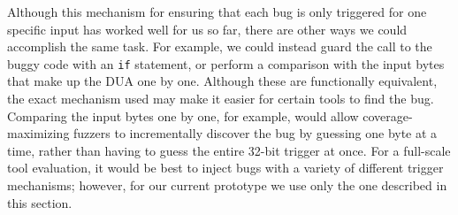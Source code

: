 Although this mechanism for ensuring that each bug is only triggered for one specific input has worked well for us so far, there are other ways we could accomplish the same task.
For example, we could instead guard the call to the buggy code with an \verb+if+ statement, or perform a comparison with the input bytes that make up the DUA one by one.
Although these are functionally equivalent, the exact mechanism used may make it easier for certain tools to find the bug.
Comparing the input bytes one by one, for example, would allow coverage-maximizing fuzzers 
to incrementally discover the bug by guessing one byte at a time, rather than having to guess the entire 32-bit trigger at once.
For a full-scale tool evaluation, it would be best to inject bugs with a variety of different trigger mechanisms; however, for our current prototype we use only the one described in this section.
